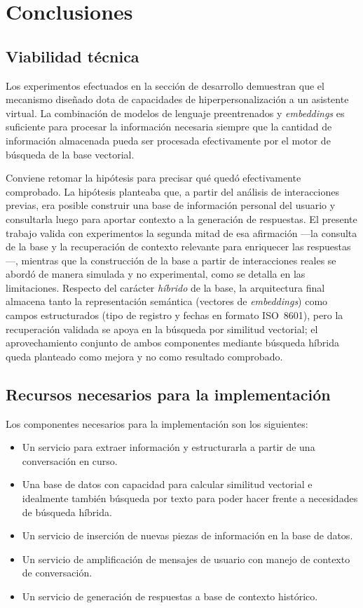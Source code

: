 \section{Conclusiones}

\subsection{Viabilidad técnica}

Los experimentos efectuados en la sección de desarrollo demuestran que el mecanismo diseñado dota de capacidades de hiperpersonalización a un asistente virtual. La combinación de modelos de lenguaje preentrenados y \textit{embeddings} es suficiente para procesar la información necesaria siempre que la cantidad de información almacenada pueda ser procesada efectivamente por el motor de búsqueda de la base vectorial.

Conviene retomar la hipótesis para precisar qué quedó efectivamente comprobado. La hipótesis planteaba que, a partir del análisis de interacciones previas, era posible construir una base de información personal del usuario y consultarla luego para aportar contexto a la generación de respuestas. El presente trabajo valida con experimentos la segunda mitad de esa afirmación —la consulta de la base y la recuperación de contexto relevante para enriquecer las respuestas—, mientras que la construcción de la base a partir de interacciones reales se abordó de manera simulada y no experimental, como se detalla en las limitaciones. Respecto del carácter \emph{híbrido} de la base, la arquitectura final almacena tanto la representación semántica (vectores de \textit{embeddings}) como campos estructurados (tipo de registro y fechas en formato ISO~8601), pero la recuperación validada se apoya en la búsqueda por similitud vectorial; el aprovechamiento conjunto de ambos componentes mediante búsqueda híbrida queda planteado como mejora y no como resultado comprobado.

\subsection{Recursos necesarios para la implementación}

Los componentes necesarios para la implementación son los siguientes:

\begin{itemize}
    \item Un servicio para extraer información y estructurarla a partir de una conversación en curso.
    \item Una base de datos con capacidad para calcular similitud vectorial e idealmente también búsqueda por texto para poder hacer frente a necesidades de búsqueda híbrida.
    \item Un servicio de inserción de nuevas piezas de información en la base de datos.
    \item Un servicio de amplificación de mensajes de usuario con manejo de contexto de conversación.
    \item Un servicio de generación de respuestas a base de contexto histórico.
\end{itemize}

